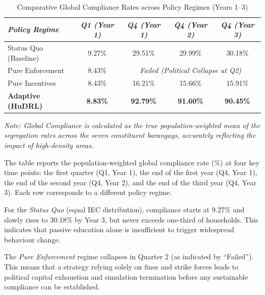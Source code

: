 \begin{table}[ht]
    \centering
    \caption{Comparative Global Compliance Rates across Policy Regimes (Years 1--3)}
    \label{tab:policy_comparison}
    \small
    \renewcommand{\arraystretch}{1.2}
    \begin{tabular}{l c c c c}
        \toprule
        \textit{Policy Regime} & \textit{Q1 (Year 1)} & \textit{Q4 (Year 1)} & \textit{Q4 (Year 2)} & \textit{Q4 (Year 3)} \\
        \midrule
        Status Quo (Baseline) & 9.27\% & 29.51\% & 29.99\% & 30.18\% \\
        Pure Enforcement & 8.43\% & \multicolumn{3}{c}{\textit{Failed (Political Collapse at Q2)}} \\
        Pure Incentives & 8.43\% & 16.21\% & 15.66\% & 15.91\% \\
        \textbf{Adaptive (HuDRL)} & \textbf{8.83\%} & \textbf{92.79\%} & \textbf{91.60\%} & \textbf{90.45\%} \\
        \bottomrule
    \end{tabular}
    \vspace{0.2cm}
    \begin{minipage}{0.9\textwidth}
        \footnotesize
        \textit{Note: Global Compliance is calculated as the true population-weighted mean of the segregation rates across the seven constituent barangays, accurately reflecting the impact of high-density areas.}
    \end{minipage}
\end{table}

The table reports the population‑weighted global compliance rate (\%) at four key time points: the first quarter (Q1, Year 1), the end of the first year (Q4, Year 1), the end of the second year (Q4, Year 2), and the end of the third year (Q4, Year 3). Each row corresponds to a different policy regime.

For the \textit{Status Quo} (equal IEC distribution), compliance starts at 9.27\% and slowly rises to 30.18\% by Year 3, but never exceeds one‑third of households. This indicates that passive education alone is insufficient to trigger widespread behaviour change.

The \textit{Pure Enforcement} regime collapses in Quarter 2 (as indicated by ``Failed''). This means that a strategy relying solely on fines and strike forces leads to political capital exhaustion and simulation termination before any sustainable compliance can be established.

